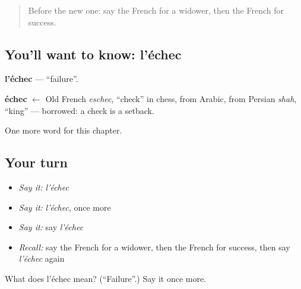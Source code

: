 \begin{quote}
Before the new one: say the French for a widower, then the French for success.
\end{quote}

\subsection*{You'll want to know: l'échec}
\textbf{l'échec} — \textquotedblleft{}failure\textquotedblright{}.

\begin{cousinweb}
\textbf{échec} $\leftarrow$ Old French \emph{eschec}, \textquotedblleft{}check\textquotedblright{} in chess, from Arabic, from Persian \emph{shah}, \textquotedblleft{}king\textquotedblright{} — borrowed: a check is a setback.
\end{cousinweb}

\begin{grammarlens}[title={What you've built}]
One more word for this chapter.
\end{grammarlens}

\subsection*{Your turn}
\begin{itemize}
\raggedright
  \item \emph{Say it:} \emph{l'échec}
  \item \emph{Say it:} \emph{l'échec}, once more
  \item \emph{Say it:} say \emph{l'échec}
  \item \emph{Recall:} say the French for a widower, then the French for success, then say \emph{l'échec} again
\end{itemize}

\begin{tcolorbox}[breakable,colback=teal!4,colframe=teal!35!black,title={Before you move on}]
What does l'échec mean? (\textquotedblleft{}Failure\textquotedblright{}.) Say it once more.
\end{tcolorbox}
